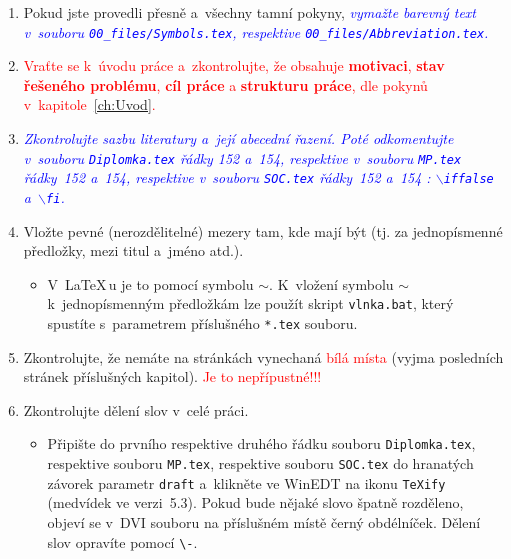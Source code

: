 \begin{enumerate}
\begin{itemize}
\begin{center}
                \verb"\chapter[Zkrácený název]{Původní (dlouhý) název}",
                \verb"\section[Zkrácený název]{Původní (dlouhý) název}",
                \verb"\caption[Zkrácený název]{Původní (dlouhý) název}".
            \end{center}
    \end{itemize}
    \item Pokud jste provedli přesně a~všechny tamní pokyny, \textcolor{blue}{\em vymažte barevný text v~souboru \newline \texttt{00\_files/Symbols.tex}, respektive \texttt{00\_files/Abbreviation.tex}.}
    \item \textcolor{red}{Vraťte se k~úvodu práce a~zkontrolujte, že obsahuje \textbf{motivaci}, \textbf{stav řešeného pro\-blé\-mu}, \textbf{cíl práce} a \textbf{strukturu práce}, dle pokynů v~kapitole~\ref{ch:Uvod}.}
    \item \textcolor{blue}{\em Zkontrolujte sazbu literatury a~její abecední řazení. Poté odkomentujte v~souboru \texttt{Diplomka.tex} řádky 152 a~154, respektive v~souboru \texttt{MP.tex} řádky~152 a~154, respektive v~souboru \texttt{SOC.tex} řádky~152 a~154 \?: $\backslash$\texttt{iffalse} a~$\backslash$\texttt{fi}.}
    \item Vložte pevné (nerozdělitelné) mezery tam, kde mají být (tj. za jednopísmenné před\-lož\-ky, mezi titul a~jméno atd.).
    \begin{itemize}
        \item V~\LaTeX\,\!u je to pomocí symbolu $\sim$. K~vložení symbolu $\sim$ k~jednopísmenným předložkám lze použít skript \verb"vlnka.bat", který spustíte s~parametrem pří\-sluš\-né\-ho \verb"*.tex" souboru.
    \end{itemize}
    \item Zkontrolujte, že nemáte na stránkách vynechaná \textcolor{red}{bílá místa} (vyjma posledních strá\-nek příslušných kapitol). \textcolor{red}{Je to nepřípustné!!!}
    \item Zkontrolujte dělení slov v~celé práci.
    \begin{itemize}
        \item Připište do prvního respektive druhého řádku souboru \texttt{Diplomka.tex}, respektive souboru \texttt{MP.tex}, respektive souboru \texttt{SOC.tex} do hranatých závorek parametr \verb"draft" a~klikněte ve \hbox{WinEDT} na ikonu \verb"TeXify" (med\-ví\-dek ve verzi~5.3). Pokud bude nějaké slovo špatně rozděleno, objeví se v~DVI souboru na příslušném místě černý obdélníček. Dělení slov opravíte pomocí \verb"\-".

\end{itemize}
\end{enumerate}
